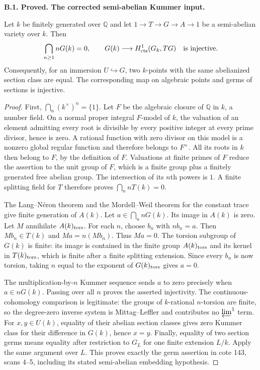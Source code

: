 \documentclass[11pt,oneside]{article}
\makeatletter
\newcounter{statementanchor}
\newenvironment{statement}[3]{%
 \refstepcounter{statementanchor}\def\@currentlabel{#1}%
 \par\addvspace{9pt}\noindent
 \textbf{#1. #2. #3.}\par\nobreak\noindent\ignorespaces
}{\par\addvspace{5pt}}
\makeatother
\begin{document}
\begin{statement}{B.1}{Proved}{The corrected semi-abelian Kummer input}
\label{st:B.1}

Let $k$ be finitely generated over $\mathbb Q$ and let
$1\to T\to G\to A\to1$ be a semi-abelian variety over $k$.
Then
\[
 \bigcap_{n\geq1}nG(k)=0,
 \qquad G(k)\longrightarrow H^1_{\rm cts}(G_k,TG)
 \quad\hbox{is injective}.
\]
Consequently, for an immersion $U\hookrightarrow G$, two $k$-points with
the same abelianized section class are equal.  The corresponding map on
algebraic points and germs of sections is injective.
\end{statement}
\begin{proof}
First, $\bigcap_n(k^\times)^n=\{1\}$.  Let $F$ be the algebraic closure of
$\mathbb Q$ in $k$, a number field.  On a normal proper integral $F$-model
of $k$, the valuation of an element admitting every root is divisible by
every positive integer at every prime divisor, hence is zero.  A rational
function with zero divisor on this model is a nonzero global regular
function and therefore belongs to $F^\times$.  All its roots in $k$ then
belong to $F$, by the definition of $F$.  Valuations at finite primes of
$F$ reduce the assertion to the unit group of $F$, which is a finite group
plus a finitely generated free abelian group.  The intersection of its
$n$th powers is $1$.  A finite splitting field for $T$ therefore proves
$\bigcap_n nT(k)=0$.

The Lang--N\'eron theorem and the Mordell--Weil theorem for the constant
trace give finite generation of $A(k)$.  Let $a\in\bigcap_n nG(k)$.
Its image in $A(k)$ is zero.  Let $M$ annihilate $A(k)_{\rm tors}$.
For each $n$, choose $b_n$ with $nb_n=a$.  Then $Mb_n\in T(k)$ and
$Ma=n(Mb_n)$.  Thus $Ma=0$.  The torsion subgroup of $G(k)$ is finite:
its image is contained in the finite group $A(k)_{\rm tors}$ and its
kernel in $T(k)_{\rm tors}$, which is finite after a finite splitting
extension.  Since every $b_n$ is now torsion, taking $n$ equal to the
exponent of $G(k)_{\rm tors}$ gives $a=0$.

The multiplication-by-$n$ Kummer sequence sends $a$ to zero precisely
when $a\in nG(k)$.  Passing over all $n$ proves the asserted injectivity.
The continuous-cohomology comparison is legitimate: the groups of
$k$-rational $n$-torsion are finite, so the degree-zero inverse system
is Mittag--Leffler and contributes no $\varprojlim^1$ term.
For $x,y\in U(k)$, equality of their abelian section classes gives zero
Kummer class for their difference in $G(k)$, hence $x=y$.
Finally, equality of two section germs means equality after restriction
to $G_L$ for one finite extension $L/k$.  Apply the same argument over
$L$.  This proves exactly the germ assertion in cote 143, scans 4--5,
including its stated semi-abelian embedding hypothesis.
\end{proof}
\end{document}
